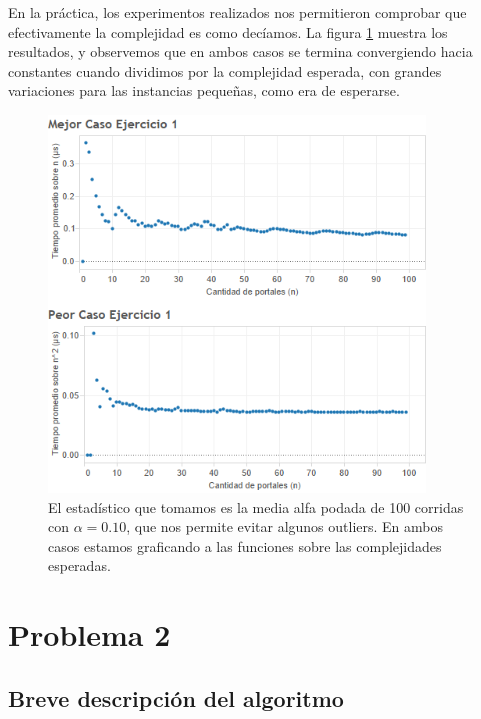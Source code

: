 \documentclass{article}
\theoremstyle{definition}
\theoremstyle{remark}
\begin{document}
En la práctica, los experimentos realizados nos permitieron comprobar que efectivamente la complejidad es como decíamos. La figura \ref{grf:ex1} muestra los resultados, y observemos que en ambos casos se termina convergiendo hacia constantes cuando dividimos por la complejidad esperada, con grandes variaciones para las instancias pequeñas, como era de esperarse. 

\begin{figure}[h!]
\centering
\includegraphics[width=10cm]{ex1}
\caption{El estadístico que tomamos es la media alfa podada de 100 corridas con $\alpha = 0.10$, que nos permite evitar algunos outliers. En ambos casos estamos graficando a las funciones sobre las complejidades esperadas. \label{grf:ex1}}
\end{figure}

\section{Problema 2}

\subsection{Breve descripción del algoritmo}
\end{document}

